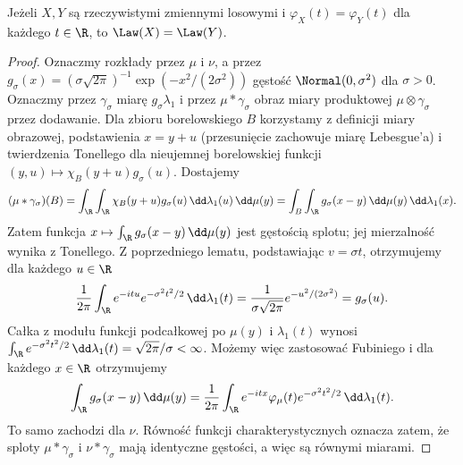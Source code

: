 \begin{twierdzenie}
Jeżeli $X,Y$ są rzeczywistymi zmiennymi losowymi i
$\varphi_X(t)=\varphi_Y(t)$ dla każdego $t\in\R$,
to $\Law(X)=\Law(Y)$.
\end{twierdzenie}
\begin{proof}
Oznaczmy rozkłady przez $\mu$ i $\nu$, a przez
$g_\sigma(x)=(\sigma\sqrt{2\pi})^{-1}
\exp(-x^2/(2\sigma^2))$ gęstość $\Normal(0,\sigma^2)$
dla $\sigma>0$. Oznaczmy przez $\gamma_\sigma$ miarę
$g_\sigma\lambda_1$ i przez $\mu*\gamma_\sigma$ obraz
miary produktowej $\mu\otimes\gamma_\sigma$ przez dodawanie.
Dla zbioru borelowskiego $B$ korzystamy z definicji
miary obrazowej, podstawienia $x=y+u$ (przesunięcie
zachowuje miarę Lebesgue'a) i twierdzenia Tonellego
dla nieujemnej borelowskiej funkcji
$(y,u)\mapsto\chi_B(y+u)g_\sigma(u)$. Dostajemy
\[
(\mu*\gamma_\sigma)(B)
=\int_\R\int_\R\chi_B(y+u)g_\sigma(u)\,
\dd\lambda_1(u)\,\dd\mu(y)
=\int_B\int_\R g_\sigma(x-y)\,\dd\mu(y)\,\dd\lambda_1(x).
\]
Zatem funkcja $x\mapsto\int_\R g_\sigma(x-y)\,\dd\mu(y)$
jest gęstością splotu; jej mierzalność wynika z Tonellego.
Z poprzedniego lematu, podstawiając $v=\sigma t$, otrzymujemy
dla każdego $u\in\R$
\[
\frac1{2\pi}\int_\R e^{-itu}e^{-\sigma^2t^2/2}\,\dd\lambda_1(t)
=\frac1{\sigma\sqrt{2\pi}}e^{-u^2/(2\sigma^2)}
=g_\sigma(u).
\]
Całka z modułu funkcji podcałkowej po $\mu(y)$ i
$\lambda_1(t)$ wynosi $\int_\R e^{-\sigma^2t^2/2}\,\dd\lambda_1(t)
=\sqrt{2\pi}/\sigma<\infty$.
Możemy więc zastosować Fubiniego i dla każdego $x\in\R$
otrzymujemy
\[
\int_\R g_\sigma(x-y)\,\dd\mu(y)
=\frac1{2\pi}\int_\R
 e^{-itx}\varphi_\mu(t)e^{-\sigma^2t^2/2}
\,\dd\lambda_1(t).
\]
To samo zachodzi dla $\nu$.
Równość funkcji charakterystycznych oznacza zatem,
że sploty $\mu*\gamma_\sigma$ i $\nu*\gamma_\sigma$ mają
identyczne gęstości, a więc są równymi miarami.


\end{proof}
